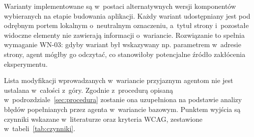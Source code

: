 Warianty implementowane są w~postaci alternatywnych wersji komponentów wybieranych na etapie budowania aplikacji. Każdy wariant udostępniany jest pod odrębnym portem lokalnym o~neutralnym oznaczeniu, a~tytuł strony i~pozostałe widoczne elementy nie zawierają informacji o~wariancie. Rozwiązanie to spełnia wymaganie WN-03: gdyby wariant był wskazywany np. parametrem w~adresie strony, agent mógłby go odczytać, co stanowiłoby potencjalne źródło zakłócenia eksperymentu.

Lista modyfikacji wprowadzanych w~wariancie przyjaznym agentom nie jest ustalana w~całości z~góry. Zgodnie z~procedurą opisaną w~podrozdziale~\ref{sec:procedura} zostanie ona uzupełniona na podstawie analizy błędów popełnianych przez agenta w~wariancie bazowym. Punktem wyjścia są czynniki wskazane w~literaturze oraz kryteria WCAG, zestawione w~tabeli~\ref{tab:czynniki}.

